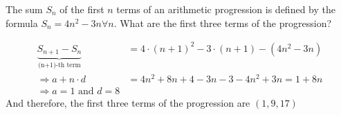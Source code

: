 
%
%
%
%
% 
% 

\question[2] The sum $S_n$ of the first $n$ terms of an arithmetic progression is defined by
the formula $S_n = 4n^2-3n \forall n$. What are the first three terms of the progression? 


\ifprintanswers
\fi 

\begin{solution}[\halfpage]
	\begin{align}
		\underbrace{S_{n+1}-S_{n}}_{\text{(n+1)-th term}} &= 4\cdot(n+1)^2-3\cdot(n+1) - (4n^2-3n) \\
		\Rightarrow a + n\cdot d &= 4n^2+8n+4-3n-3-4n^2+3n = 1 + 8n \\
		\Rightarrow a = 1 \text{ and } d = 8
	\end{align}
	And therefore, the first three terms of the progression are $(1,9,17)$
\end{solution}

